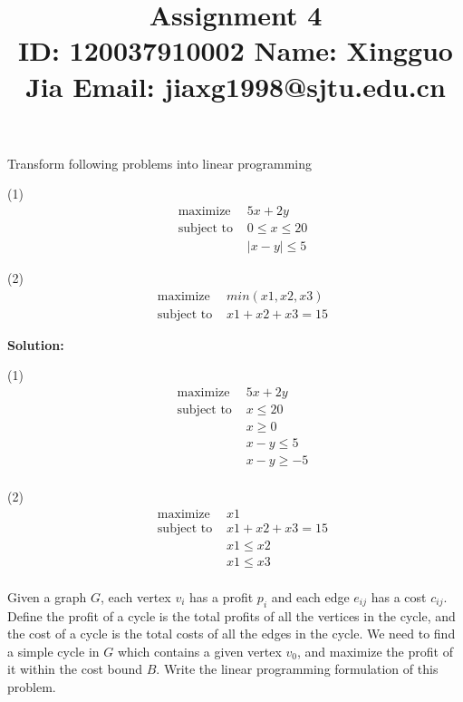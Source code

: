 \documentclass{article}
\title{{\bf Assignment 4} \\ {\large ID: 120037910002 } {\large Name: Xingguo Jia } {\large Email: jiaxg1998@sjtu.edu.cn}}
\author{}
\date{}
\newcounter{exercise}
\newcommand{\<}{
    \langle}
\renewcommand{\>}{
    \rangle}
\begin{document}
\maketitle


{\large

\begin{exercise}
	Transform following problems into linear programming
	
	(1)
		$$\begin{aligned}
		&\text { maximize } & 5x+2y\\
		&\text { subject to } & 0 \le x \le 20 \\
		& & |x - y|\le 5
		\end{aligned}$$
		
	(2)
		$$\begin{aligned}
		&\text { maximize }  & min(x1,x2,x3)\\
		&\text { subject to }  & x1+x2+x3 = 15
		\end{aligned}$$
\end{exercise}

\textbf{Solution:}

	(1)
		$$\begin{aligned}
		&\text { maximize } & 5x+2y\\
		&\text { subject to } & x \le 20 \\
		& & x \ge 0 \\
		& & x - y\le 5 \\
		& & x - y\ge -5 \\
		\end{aligned}$$

	(2)
		$$\begin{aligned}
		&\text { maximize }  & x1\\
		&\text { subject to }  & x1+x2+x3 = 15 \\
		& & x1\leq x2\\
		& & x1\leq x3\\
		\end{aligned}$$

\newpage


\begin{exercise}
	Given a graph $G$, each vertex $v_i$ has a profit $p_i$ and each edge $e_{ij}$ has a cost $c_{ij}$. Define the profit of a cycle is the total profits of all the vertices in the cycle, and the cost of a cycle is the total costs of all the edges in the cycle. We need to find a simple cycle in $G$ which contains a given vertex $v_0$, and maximize the profit of it within the cost bound $B$. Write the linear programming formulation of this problem.
\end{exercise}

}
\end{document}
